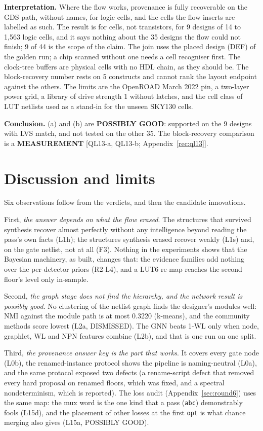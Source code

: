 \documentclass[conference]{IEEEtran}
\newcommand{\verdict}[1]{\textbf{\textsc{#1}}}
\newcommand{\hev}[1]{\par\smallskip\noindent\textbf{#1}}
\newcommand{\code}[1]{\texttt{#1}}
\begin{document}
\hev{Interpretation.} Where the flow works, provenance is fully recoverable on the GDS path, without names, for logic cells, and the cells the flow inserts are labelled as such. The result is for cells, not transistors, for 9 designs of 14 to 1,563 logic cells, and it says nothing about the 35 designs the flow could not finish; 9 of 44 is the scope of the claim. The join uses the placed design (DEF) of the golden run; a chip scanned without one needs a cell recogniser first. The clock-tree buffers are physical cells with no HDL chain, as they should be. The block-recovery number rests on 5 constructs and cannot rank the layout endpoint against the others. The limits are the OpenROAD March 2022 pin, a two-layer power grid, a library of drive strength 1 without latches, and the cell class of LUT netlists used as a stand-in for the unseen SKY130 cells.

\hev{Conclusion.} (a) and (b) are \verdict{POSSIBLY GOOD}: supported on the 9 designs with LVS match, and not tested on the other 35. The block-recovery comparison is a \verdict{MEASUREMENT} [QL13-a, QL13-b; Appendix~\ref{rec:ql13}].

\section{Discussion and limits}
\label{sec:discussion}

Six observations follow from the verdicts, and then the candidate innovations.

First, \emph{the answer depends on what the flow erased}. The structures that survived synthesis
recover almost perfectly without any intelligence beyond reading the pass's own facts (L1h); the
structures synthesis erased recover weakly (L1s) and, on the gate netlist, not at all (F3). Nothing in
the experiments shows that the Bayesian machinery, as built, changes that: the evidence families add
nothing over the per-detector priors (R2-L4), and a LUT6 re-map reaches the second floor's level only
in-sample.

Second, \emph{the graph stage does not find the hierarchy, and the network result is possibly good}.
No clustering of the netlist graph finds the designer's modules well: NMI against the module path is
at most 0.3220 (k-means), and the community methods score lowest (L2a, DISMISSED). The GNN beats
1-WL only when node, graphlet, WL and NPN features combine (L2b), and that is one run on one split.

Third, \emph{the provenance answer key is the part that works}. It covers every gate node (L0b), the
renamed-instance protocol shows the pipeline is naming-neutral (L0a), and the same protocol exposed two
defects (a rename-script defect that removed every hard proposal on renamed floors, which was fixed,
and a spectral nondeterminism, which is reported). The loss audit (Appendix~\ref{sec:round6}) uses the
same map: the mux word is the one kind that a pass (\code{abc}) demonstrably fools (L15d), and the
placement of other losses at the first \code{opt} is what chance merging also gives (L15a, POSSIBLY GOOD).
\end{document}
